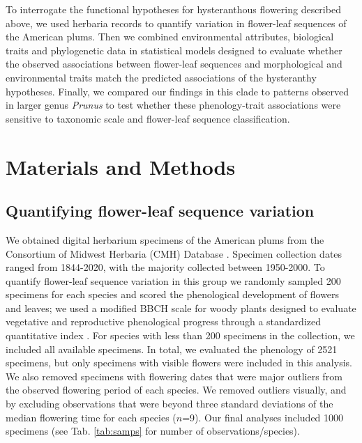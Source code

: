 \documentclass{article}[12pt]
\begin{document}
\noindent To interrogate the functional hypotheses for hysteranthous flowering described above, we used herbaria records to quantify variation in flower-leaf sequences of the American plums. Then we combined environmental attributes, biological traits and phylogenetic data in statistical models designed to evaluate whether the observed associations between flower-leaf sequences and morphological and environmental traits match the predicted associations of the hysteranthy hypotheses. Finally, we compared our findings in this clade to patterns observed in larger genus \emph{Prunus} to test whether these phenology-trait associations were sensitive to taxonomic scale and flower-leaf sequence classification. %

\section*{Materials and Methods}
\subsection*{Quantifying flower-leaf sequence variation}  
We obtained digital herbarium specimens of the American plums from the Consortium of Midwest Herbaria (CMH) Database \citep{CMH}. Specimen collection dates ranged from 1844-2020, with the majority collected between 1950-2000. To quantify flower-leaf sequence variation in this group we randomly sampled 200 specimens for each species and scored the phenological development of flowers and leaves; we used a modified BBCH scale for woody plants  designed to evaluate vegetative and reproductive phenological progress through a standardized quantitative index \citep{Finn2007}. For species with less than 200 specimens in the collection, we included all available specimens. In total, we evaluated the phenology of 2521 specimens, but only specimens with visible flowers were included in this analysis. We also removed specimens with flowering dates that were major outliers from the observed flowering period of each species. We removed outliers visually, and by excluding observations that were beyond three standard deviations of the median flowering time for each species ($n$=9). Our final analyses included 1000 specimens (see Tab. \ref{tab:samps} for number of observations/species). 
\end{document}
